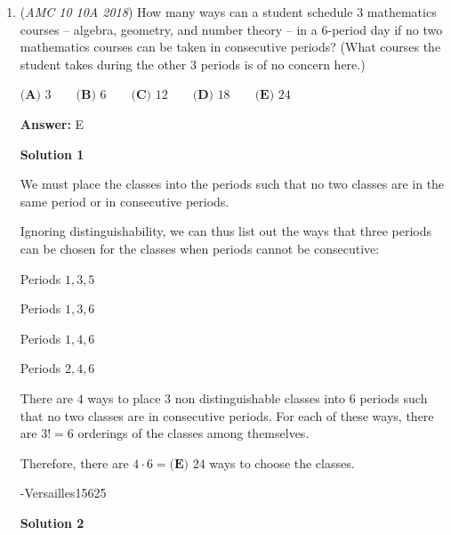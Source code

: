 \begin{enumerate}
 



\textbf{Solution 2 (Concise)}

There are $60 \cdot 60 \cdot 24 = 86400$ seconds in a day, which means that Yasin's blood expires in $10! \div 86400 = 42$ days. Since there are $31$ days in January (consult a calendar), then $42-31+1$ (Jan 1 doesn't count) is $12$ days into February, so $\boxed{\textbf{(E) }\text{February 12}}$.

 Education, the Study of Everything

 


 


 


	\item (\textit{AMC 10 10A 2018}) How many ways can a student schedule $3$ mathematics courses -- algebra, geometry, and number theory -- in a $6$-period day if no two mathematics courses can be taken in consecutive periods? (What courses the student takes during the other $3$ periods is of no concern here.)


 $\textbf{(A) }3\qquad\textbf{(B) }6\qquad\textbf{(C) }12\qquad\textbf{(D) }18\qquad\textbf{(E) }24$

 \textbf{Answer: }E



\textbf{Solution 1}

We must place the classes into the periods such that no two classes are in the same period or in consecutive periods.

 Ignoring distinguishability, we can thus list out the ways that three periods can be chosen for the classes when periods cannot be consecutive:

 Periods $1, 3, 5$

 
Periods $1, 3, 6$

 Periods $1, 4, 6$

 Periods $2, 4, 6$

 There are $4$ ways to place $3$ non distinguishable classes into $6$ periods such that no two classes are in consecutive periods. For each of these ways, there are $3! = 6$ orderings of the classes among themselves.

 Therefore, there are $4 \cdot 6 = \boxed{\textbf{(E) } 24}$ ways to choose the classes.

 -Versailles15625

 



\textbf{Solution 2}


\end{enumerate}
